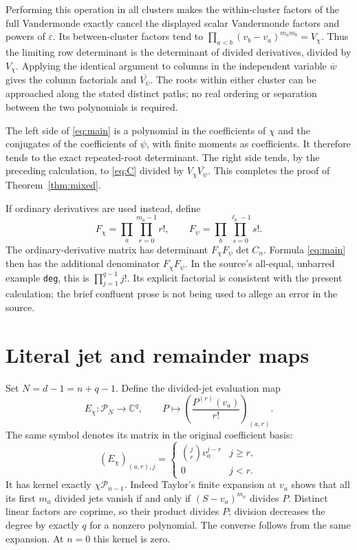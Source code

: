\documentclass[11pt]{article}
\newcommand{\C}{\mathbb C}
\newcommand{\Pp}{\mathcal P}
\begin{document}
Performing this operation in all clusters makes the within-cluster
factors of the full Vandermonde exactly cancel the displayed scalar
Vandermonde factors and powers of \(\varepsilon\). Its between-cluster
factors tend to \(\prod_{a<b}(v_b-v_a)^{m_am_b}=V_\chi\).
Thus the limiting row determinant is the determinant of divided
derivatives, divided by \(V_\chi\). Applying the identical argument to
columns in the independent variable \(\overline w\) gives the column
factorials and \(\overline{V_\psi}\). The roots within either cluster
can be approached along the stated distinct paths; no real ordering or
separation between the two polynomials is required.

The left side of \eqref{eq:main} is a polynomial in the coefficients of
\(\chi\) and the conjugates of the coefficients of \(\psi\), with
finite moments as coefficients. It therefore tends to the exact
repeated-root determinant. The right side tends, by the preceding
calculation, to \eqref{eq:C} divided by
\(V_\chi\overline{V_\psi}\). This completes the proof of
Theorem~\ref{thm:mixed}.

If ordinary derivatives are used instead, define
\[
 F_\chi=\prod_a\prod_{r=0}^{m_a-1}r!,\qquad
 F_\psi=\prod_b\prod_{s=0}^{\ell_b-1}s!.
\]
The ordinary-derivative matrix has determinant
\(F_\chi F_\psi\det C_n\). Formula \eqref{eq:main} then has the
additional denominator \(F_\chi F_\psi\).
In the source's all-equal, unbarred example \texttt{deg}, this is
\(\prod_{j=1}^{q-1}j!\). Its explicit factorial is consistent with the
present calculation; the brief confluent prose is not being used to
allege an error in the source.

\section{Literal jet and remainder maps}\label{sec:maps}

Set \(N=d-1=n+q-1\). Define the divided-jet evaluation map
\begin{equation}\label{eq:E}
 E_\chi:\Pp_N\longrightarrow\C^q,
 \qquad P\longmapsto
       \left(\frac{P^{(r)}(v_a)}{r!}\right)_{(a,r)}.
\end{equation}
The same symbol denotes its matrix in the original coefficient basis:
\[
 (E_\chi)_{(a,r),j}=
 \begin{cases}\binom jr v_a^{j-r}&j\geq r,\\0&j<r.\end{cases}
\]
It has kernel exactly \(\chi\Pp_{n-1}\). Indeed Taylor's finite
expansion at \(v_a\) shows that all its first \(m_a\) divided jets
vanish if and only if \((S-v_a)^{m_a}\) divides \(P\). Distinct linear
factors are coprime, so their product divides \(P\); division decreases
the degree by exactly \(q\) for a nonzero polynomial. The converse
follows from the same expansion. At \(n=0\) this kernel is zero.
\end{document}

